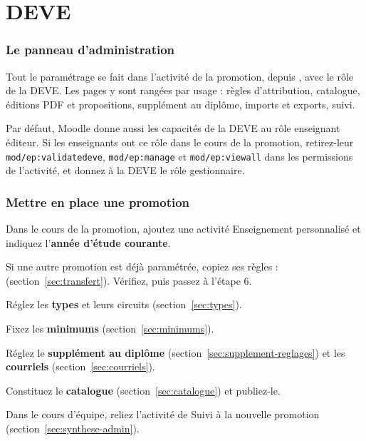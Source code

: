 \documentclass[11pt,a4paper]{article}
\begin{document}
\newpage
\part{DEVE}\label{part:deve}

\section{Le panneau d'administration}

Tout le paramétrage se fait dans l'activité de la promotion, depuis ,
avec le rôle de la DEVE. Les pages y sont rangées par usage : règles d'attribution, catalogue,
éditions PDF et propositions, supplément au diplôme, imports et exports, suivi.


\begin{attention}
Par défaut, Moodle donne aussi les capacités de la DEVE au rôle \og enseignant éditeur\fg{}.
Si les enseignants ont ce rôle dans le cours de la promotion, retirez-leur
\texttt{mod/ep:validatedeve}, \texttt{mod/ep:manage} et \texttt{mod/ep:viewall} dans les
permissions de l'activité, et donnez à la DEVE le rôle \og gestionnaire\fg{}.
\end{attention}

\section{Mettre en place une promotion}\label{sec:miseenplace}

\begin{etapes}
  \item Dans le cours de la promotion, ajoutez une activité \og Enseignement personnalisé\fg{}
    et indiquez l'\textbf{année d'étude courante}.
  \item Si une autre promotion est déjà paramétrée, copiez ses règles :
    (section~\ref{sec:transfert}). Vérifiez, puis passez à l'étape 6.
  \item Réglez les \textbf{types} et leurs circuits (section~\ref{sec:types}).
  \item Fixez les \textbf{minimums} (section~\ref{sec:minimums}).
  \item Réglez le \textbf{supplément au diplôme} (section~\ref{sec:supplement-reglages}) et les
    \textbf{courriels} (section~\ref{sec:courriels}).
  \item Constituez le \textbf{catalogue} (section~\ref{sec:catalogue}) et publiez-le.
  \item Dans le cours d'équipe, reliez l'activité de \og Suivi\fg{} à la nouvelle promotion
    (section~\ref{sec:synthese-admin}).
\end{etapes}
\end{document}
